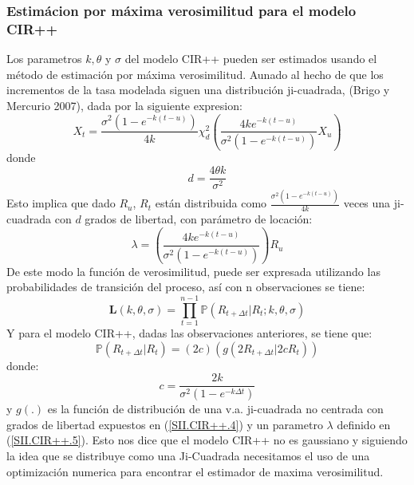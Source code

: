 \documentclass[11pt,notitlepage]{article}
\begin{document}
        \subsubsection{Estimácion por máxima verosimilitud para el modelo CIR++}
        Los parametros \(k, \theta\) y \(\sigma\) del modelo  CIR++ pueden ser estimados usando el método de estimación por máxima verosimilitud. Aunado al hecho de que los incrementos de la tasa modelada siguen una distribución ji-cuadrada, (Brigo y Mercurio 2007), dada por la siguiente expresion:
       \begin{equation*}
             X_{t}=\frac{\sigma^{2}(1-e^{-k(t-u)})}{4k}\chi^{2}_{d} \left ( \frac{4ke^{-k(t-u)}}{\sigma ^{2}(1-e^{-k(t-u)})}X_u \right )
        \end{equation*}
donde 
\begin{equation}\label{SII.CIR++.4}
d= \frac{4\theta k}{\sigma ^{2}}
\end{equation}
    Esto implica que dado \(R_{u}\), \(R_{t}\) están distribuida como \(\frac{\sigma^{2}(1-e^{-k(t-u)})}{4k}\) veces una ji-cuadrada con \(d\) grados de libertad, con parámetro de locación: 
    \begin{equation}\label{SII.CIR++.5}
       \lambda= \left ( \frac{4ke^{-k(t-u)}}{\sigma ^{2}(1-e^{-k(t-u)})} \right )R_{u}
    \end{equation}
De este modo la función de verosimilitud, puede ser expresada utilizando las probabilidades de transición del proceso, así con n observaciones se tiene:   
\begin{equation*}
    \boldsymbol{L}\left ( k,\theta,\sigma \right )=\prod_{t=1}^{n-1}\mathbb{P}\left ( R_{
t+\Delta t}| R_{t};k, \theta, \sigma \right )
\end{equation*}
Y para el modelo CIR++, dadas las observaciones anteriores, se tiene que: 
\begin{equation*}
\mathbb{P}\left ( R_{
t+\Delta t}| R_{t} \right )=(2c)\left(g\left ( 2R_{t+\Delta t}|2cR_{t} \right )\right)
\end{equation*}
donde: 
\begin{equation*}
    c=\frac{2k}{\sigma^{2}\left ( 1-e^{-k \Delta t} \right )}
\end{equation*}
    y \(g(.) \) es la función de distribución de una v.a. ji-cuadrada  no centrada con grados de libertad expuestos en (\ref{SII.CIR++.4}) y un parametro \( \lambda \) definido en (\ref{SII.CIR++.5}).
    Esto nos dice que el modelo CIR++ no es gaussiano y siguiendo la idea  que se distribuye como una Ji-Cuadrada necesitamos el uso de una optimización numerica para encontrar el estimador de maxima verosimilitud.
\end{document}
